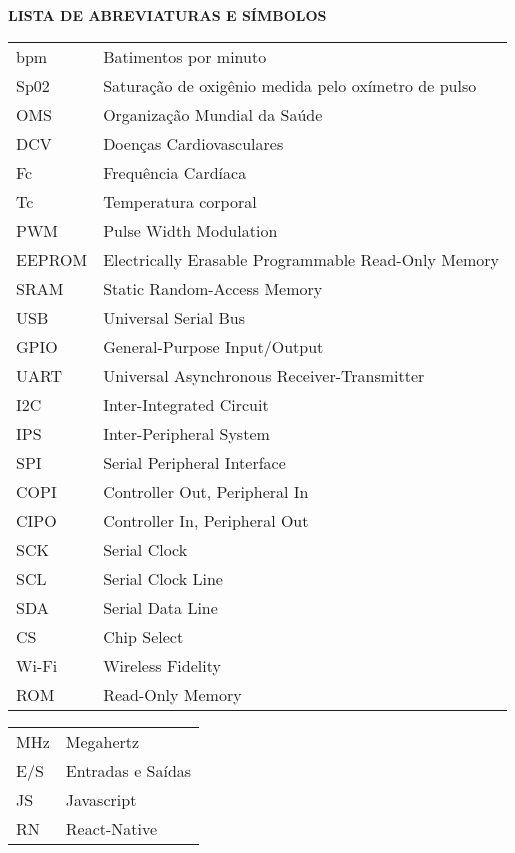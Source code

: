 \centering \textbf{\large{LISTA DE ABREVIATURAS E SÍMBOLOS} }

\vspace{2 cm}
\justifying
\begin{tabular}{l l}
    bpm & Batimentos por minuto\\[10pt]
    Sp02 & Saturação de oxigênio medida pelo oxímetro de pulso\\[10pt]
    OMS & Organização Mundial da Saúde\\[10pt]
    DCV & Doenças Cardiovasculares\\[10pt]
    Fc & Frequência Cardíaca\\[10pt]
    Tc & Temperatura corporal\\[10pt]
    PWM & Pulse Width Modulation\\[10pt]
    EEPROM & Electrically Erasable Programmable Read-Only Memory\\[10pt]
    SRAM & Static Random-Access Memory\\[10pt]
    USB & Universal Serial Bus\\[10pt]
    GPIO & General-Purpose Input/Output\\[10pt]
    UART & Universal Asynchronous Receiver-Transmitter\\[10pt]
    I2C & Inter-Integrated Circuit\\[10pt]
    IPS & Inter-Peripheral System\\[10pt]
    SPI & Serial Peripheral Interface\\[10pt]
    COPI & Controller Out, Peripheral In\\[10pt]
    CIPO & Controller In, Peripheral Out\\[10pt]
    SCK & Serial Clock\\[10pt]
    SCL & Serial Clock Line\\[10pt]
    SDA & Serial Data Line\\[10pt]
    CS & Chip Select\\[10pt]
    Wi-Fi & Wireless Fidelity\\[10pt]
    ROM & Read-Only Memory\\[10pt]
\end{tabular}

\newpage
\thispagestyle{empty}
\begin{tabular}{l l}
    MHz & Megahertz\\[10pt]
    E/S & Entradas e Saídas\\[10pt]
    JS & Javascript\\[10pt]
    RN & React-Native\\[10pt]
\end{tabular}
           